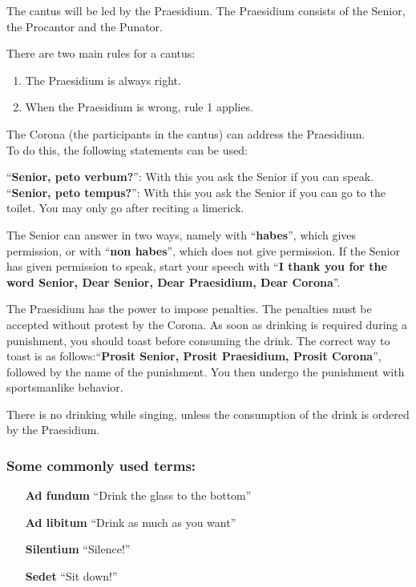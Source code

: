 The cantus will be led by the Praesidium. The Praesidium consists of the Senior, the Procantor and the Punator.

There are two main rules for a cantus:
\begin{enumerate}
    \item The Praesidium is always right.
    \item When the Praesidium is wrong, rule 1 applies.
\end{enumerate}

The Corona (the participants in the cantus) can address the Praesidium.\\
To do this, the following statements can be used:

“\textbf{Senior, peto verbum?}”: With this you ask the Senior if you can speak.\\
“\textbf{Senior, peto tempus?}”: With this you ask the Senior if you can go to the toilet. You may only go after reciting a limerick.  

The Senior can answer in two ways, namely with “\textbf{habes}”, which gives permission, or with “\textbf{non habes}”, which does not give permission. If the Senior has given permission to speak, start your speech with “\textbf{I thank you for the word Senior, Dear Senior, Dear Praesidium, Dear Corona}”.

The Praesidium has the power to impose penalties. The penalties must be accepted without protest by the Corona. As soon as drinking is required during a punishment, you should toast before consuming the drink. The correct way to toast is as follows:“\textbf{Prosit Senior, Prosit Praesidium, Prosit Corona}”, followed by the name of the punishment. You then undergo the punishment with sportsmanlike behavior.

There is no drinking while singing, unless the consumption of the drink is ordered by the Praesidium.

\subsubsection*{Some commonly used terms:}
\begin{enumerate}
\item[\textbf{Ad fundum}] “Drink the glass to the bottom”
\item[\textbf{Ad libitum}] “Drink as much as you want”
\item[\textbf{Silentium}] “Silence!”
\item[\textbf{Sedet}] “Sit down!”
\end{enumerate}

